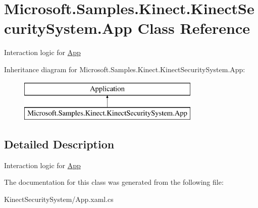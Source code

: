 \hypertarget{class_microsoft_1_1_samples_1_1_kinect_1_1_kinect_security_system_1_1_app}{}\section{Microsoft.\+Samples.\+Kinect.\+Kinect\+Security\+System.\+App Class Reference}
\label{class_microsoft_1_1_samples_1_1_kinect_1_1_kinect_security_system_1_1_app}


Interaction logic for \hyperlink{class_microsoft_1_1_samples_1_1_kinect_1_1_kinect_security_system_1_1_app}{App}  


Inheritance diagram for Microsoft.\+Samples.\+Kinect.\+Kinect\+Security\+System.\+App\+:\begin{figure}[H]
\begin{center}
\leavevmode
\includegraphics[height=2.000000cm]{class_microsoft_1_1_samples_1_1_kinect_1_1_kinect_security_system_1_1_app}
\end{center}
\end{figure}


\subsection{Detailed Description}
Interaction logic for \hyperlink{class_microsoft_1_1_samples_1_1_kinect_1_1_kinect_security_system_1_1_app}{App} 



The documentation for this class was generated from the following file\+:\begin{DoxyCompactItemize}
\item 
Kinect\+Security\+System/App.\+xaml.\+cs\end{DoxyCompactItemize}
